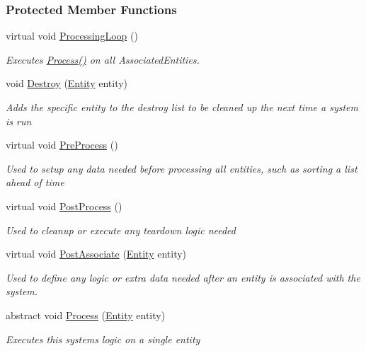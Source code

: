 \subsubsection*{Protected Member Functions}
\begin{DoxyCompactItemize}
\item 
virtual void \hyperlink{class_m_b2_d_1_1_entity_component_1_1_entity_system_a75552787342e68c427bf2e1ffa60ed6c}{Processing\+Loop} ()
\begin{DoxyCompactList}\small\item\em Executes \hyperlink{class_m_b2_d_1_1_entity_component_1_1_entity_system_abbf83b87cb5d12754fb058cef50451fa}{Process()} on all Associated\+Entities. \end{DoxyCompactList}\item 
void \hyperlink{class_m_b2_d_1_1_entity_component_1_1_entity_system_a86f27e2e12da562903092d5afb9dd70d}{Destroy} (\hyperlink{class_m_b2_d_1_1_entity_component_1_1_entity}{Entity} entity)
\begin{DoxyCompactList}\small\item\em Adds the specific entity to the destroy list to be cleaned up the next time a system is run \end{DoxyCompactList}\item 
virtual void \hyperlink{class_m_b2_d_1_1_entity_component_1_1_entity_system_aadc002dd04d9cb75775ca955a28e303e}{Pre\+Process} ()
\begin{DoxyCompactList}\small\item\em Used to setup any data needed before processing all entities, such as sorting a list ahead of time \end{DoxyCompactList}\item 
virtual void \hyperlink{class_m_b2_d_1_1_entity_component_1_1_entity_system_aa215c796a01092b66eb70c5726dfac75}{Post\+Process} ()
\begin{DoxyCompactList}\small\item\em Used to cleanup or execute any teardown logic needed \end{DoxyCompactList}\item 
virtual void \hyperlink{class_m_b2_d_1_1_entity_component_1_1_entity_system_ae8d1330e220d3ae7c8f6640c5d4aacd0}{Post\+Associate} (\hyperlink{class_m_b2_d_1_1_entity_component_1_1_entity}{Entity} entity)
\begin{DoxyCompactList}\small\item\em Used to define any logic or extra data needed after an entity is associated with the system. \end{DoxyCompactList}\item 
abstract void \hyperlink{class_m_b2_d_1_1_entity_component_1_1_entity_system_abbf83b87cb5d12754fb058cef50451fa}{Process} (\hyperlink{class_m_b2_d_1_1_entity_component_1_1_entity}{Entity} entity)
\begin{DoxyCompactList}\small\item\em Executes this systems logic on a single entity \end{DoxyCompactList}\end{DoxyCompactItemize}
